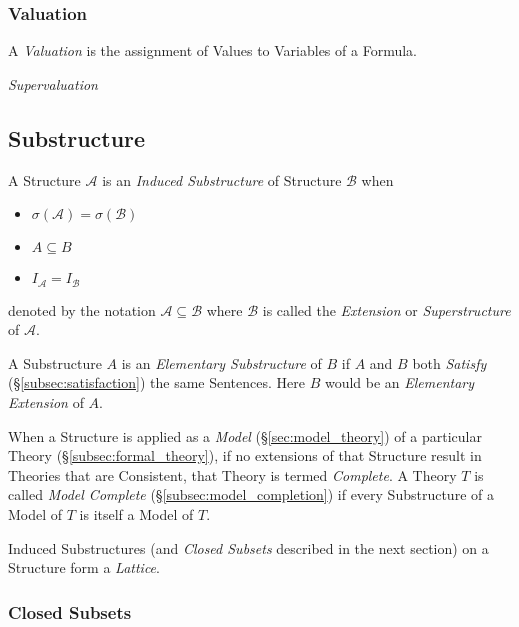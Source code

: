 \documentclass{article}
\begin{document}
\subsubsection{Valuation}\label{subsec:model_valuation}

A \emph{Valuation} is the assignment of Values to Variables of a
Formula.

\emph{Supervaluation}



\subsection{Substructure}\label{subsec:model_substructure}

A Structure $\mathcal{A}$ is an \emph{Induced Substructure} of
Structure $\mathcal{B}$ when
\begin{itemize}
\item $\sigma(\mathcal{A}) = \sigma(\mathcal{B})$
\item $A \subseteq B$
\item $I_{\mathcal{A}}=I_{\mathcal{B}}$
\end{itemize}
denoted by the notation $\mathcal{A} \subseteq \mathcal{B}$ where
$\mathcal{B}$ is called the \emph{Extension} or \emph{Superstructure}
of $\mathcal{A}$.

A Substructure $A$ is an \emph{Elementary Substructure} of $B$ if $A$
and $B$ both \emph{Satisfy} (\S\ref{subsec:satisfaction}) the same
Sentences. Here $B$ would be an \emph{Elementary Extension} of $A$.

When a Structure is applied as a \emph{Model}
(\S\ref{sec:model_theory}) of a particular Theory
(\S\ref{subsec:formal_theory}), if no extensions of that Structure
result in Theories that are Consistent, that Theory is termed
\emph{Complete}. A Theory $T$ is called \emph{Model Complete}
(\S\ref{subsec:model_completion}) if every Substructure of a Model of
$T$ is itself a Model of $T$.

Induced Substructures (and \emph{Closed Subsets} described in the next
section) on a Structure form a \emph{Lattice}.



\subsubsection{Closed Subsets}
\end{document}
